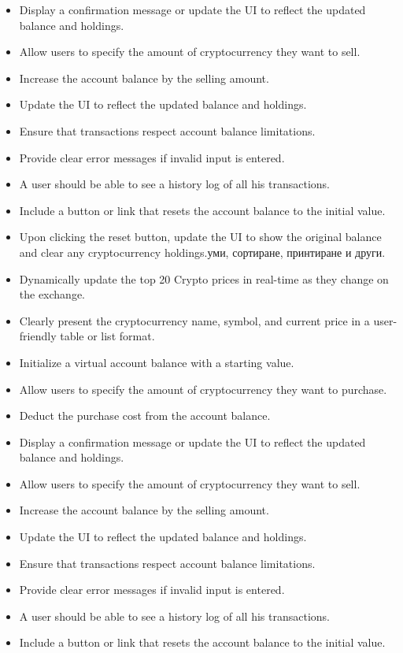 \documentclass[a4paper,12pt]{article}
\begin{document}
\begin{itemize}
    \item Display a confirmation message or update the UI to reflect the updated balance and holdings.
    \item Allow users to specify the amount of cryptocurrency they want to sell.
    \item Increase the account balance by the selling amount.
    \item Update the UI to reflect the updated balance and holdings.
    \item Ensure that transactions respect account balance limitations.
    \item Provide clear error messages if invalid input is entered.
    \item A user should be able to see a history log of all his transactions.
    \item Include a button or link that resets the account balance to the initial value.
    \item Upon clicking the reset button, update the UI to show the original balance and clear any cryptocurrency holdings.уми, сортиране, принтиране и други.
    \item Dynamically update the top 20 Crypto prices in real-time as they change on the exchange.
    \item Clearly present the cryptocurrency name, symbol, and current price in a user-friendly table or list format.
    \item Initialize a virtual account balance with a starting value.
    \item Allow users to specify the amount of cryptocurrency they want to purchase.
    \item Deduct the purchase cost from the account balance.
    \item Display a confirmation message or update the UI to reflect the updated balance and holdings.
    \item Allow users to specify the amount of cryptocurrency they want to sell.
    \item Increase the account balance by the selling amount.
    \item Update the UI to reflect the updated balance and holdings.
    \item Ensure that transactions respect account balance limitations.
    \item Provide clear error messages if invalid input is entered.
    \item A user should be able to see a history log of all his transactions.
    \item Include a button or link that resets the account balance to the initial value.

\end{itemize}
\end{document}

